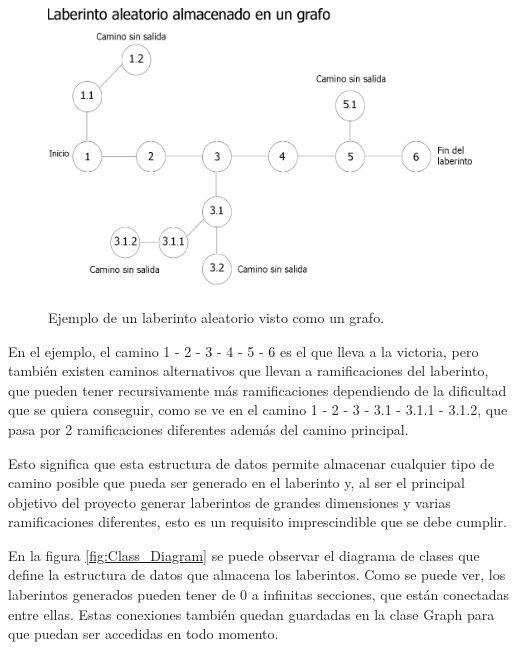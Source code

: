\documentclass[../main.tex]{subfiles}
\begin{document}
\begin{figure}[h!]
\centering
\includegraphics[width = 12cm, height = 8cm]{imagenes/Laberinto_Grafo.png}
\caption{Ejemplo de un laberinto aleatorio visto como un grafo.}
\label{fig:Maze_Graph}
\end{figure}

En el ejemplo, el camino 1 - 2 - 3 - 4 - 5 - 6 es el que lleva a la victoria, pero también existen caminos alternativos que llevan a ramificaciones del laberinto, que pueden tener recursivamente más ramificaciones dependiendo de la dificultad que se quiera conseguir, como se ve en el camino 1 - 2 - 3 - 3.1 - 3.1.1 - 3.1.2, que pasa por 2 ramificaciones diferentes además del camino principal. 

Esto significa que esta estructura de datos permite almacenar cualquier tipo de camino posible que pueda ser generado en el laberinto y, al ser el principal objetivo del proyecto generar laberintos de grandes dimensiones y varias ramificaciones diferentes, esto es un requisito imprescindible que se debe cumplir.

En la figura \ref{fig:Class_Diagram} se puede observar el diagrama de clases que define la estructura de datos que almacena los laberintos. Como se puede ver, los laberintos generados pueden tener de 0 a infinitas secciones, que están conectadas entre ellas. Estas conexiones también quedan guardadas en la clase Graph para que puedan ser accedidas en todo momento.
\end{document}
